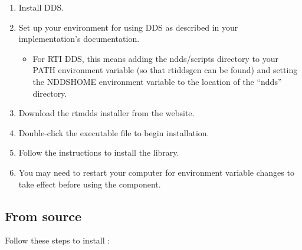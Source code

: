 \documentclass[a4paper,10pt]{article}
\begin{document}
\begin{enumerate}
  \item Install DDS.
  \item Set up your environment for using DDS as described in your
  implementation's documentation.
  \begin{itemize}
    \item For RTI DDS, this means adding the ndds/scripts directory to
    your PATH environment variable (so that rtiddsgen can be found) and
    setting the NDDSHOME environment variable to the location of the
    ``ndds'' directory.
  \end{itemize}
  \item Download the rtmdds installer from the website.
  \item Double-click the executable file to begin installation.
  \item Follow the instructions to install the library.
  \item You may need to restart your computer for environment variable
  changes to take effect before using the component.
\end{enumerate}

\subsection{From source}

Follow these steps to install :
\end{document}
